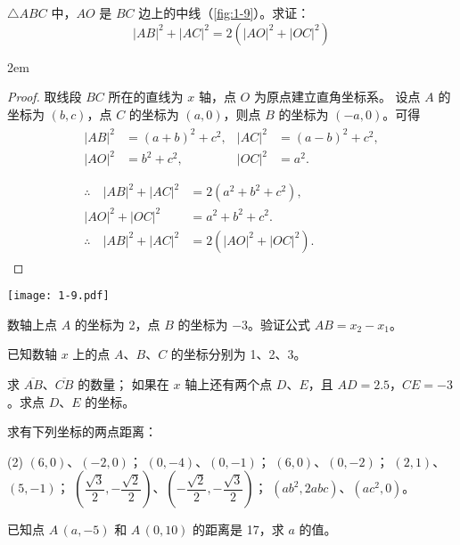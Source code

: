 \begin{example}
  $\triangle ABC$ 中，$AO$ 是 $BC$ 边上的中线（\cref{fig:1-9}）。求证：
  \[ |AB|^2 + |AC|^2 =2(|AO|^2+|OC|^2)\]
\end{example}

\medskip\noindent
\begin{minipage}{0.67\linewidth}\parindent2em
\begin{proof}
  取线段 $BC$ 所在的直线为 $x$ 轴，点 $O$ 为原点建立直角坐标系。
  设点 $A$ 的坐标为 $(b,c)$，点 $C$ 的坐标为 $(a,0)$，则点 $B$ 的坐标为 $(-a,0)$。可得
  \begin{gather*}
  \begin{aligned}
    |AB|^2 &=(a+b)^2+c^2, & |AC|^2&=(a-b)^2+c^2,\\
    |AO|^2 &=b^2+c^2, & |OC|^2&=a^2.\\
  \end{aligned}\\
  \begin{aligned}
    \therefore\quad |AB|^2 +|AC|^2 &=2(a^2+b^2+c^2),\\
    |AO|^2 +|OC|^2 &=a^2+b^2+c^2.\\
    \therefore\quad |AB|^2 +|AC|^2 &=2(|AO|^2 +|OC|^2).
  \end{aligned}
\end{gather*}
\end{proof}
\end{minipage}\hfill
\begin{minipage}{0.28\linewidth}\centering
  \begin{figurehere}
    \texttt{[image: 1-9.pdf]}
    \caption{}\label{fig:1-9}
  \end{figurehere}
\end{minipage}

\begin{Practice}
  \begin{question}
    \item 数轴上点 $A$ 的坐标为 2，点 $B$ 的坐标为 $-3$。验证公式 $AB=x_2-x_1$。
    \item 已知数轴 $x$ 上的点 $A$、$B$、$C$ 的坐标分别为 1、2、3。
    \begin{tasks}
      \task 求 $\overline{AB}$、$\overline{CB}$ 的数量；
      \task 如果在 $x$ 轴上还有两个点 $D$、$E$，且 $AD=2.5$，$CE=-3$。求点 $D$、$E$ 的坐标。
    \end{tasks}
    \item 求有下列坐标的两点距离：
    \begin{tasks}(2)
      \task  $(6,0)$、$(-2,0)$；
      \task  $(0,-4)$、$(0,-1)$；
      \task  $(6,0)$、$(0,-2)$；
      \task  $(2,1)$、$(5,-1)$；
      \task  $\left(\dfrac{\sqrt{3}}{2},-\dfrac{\sqrt{2}}{2}\right)$、$\left(-\dfrac{\sqrt{2}}{2},-\dfrac{\sqrt{3}}{2}\right)$；
      \task  $(ab^2,2abc)$、$(ac^2,0)$。
    \end{tasks}
    \item 已知点 $A\,(a,-5)$ 和 $A\,(0,10)$ 的距离是 17，求 $a$ 的值。
  \end{question}
\end{Practice}

